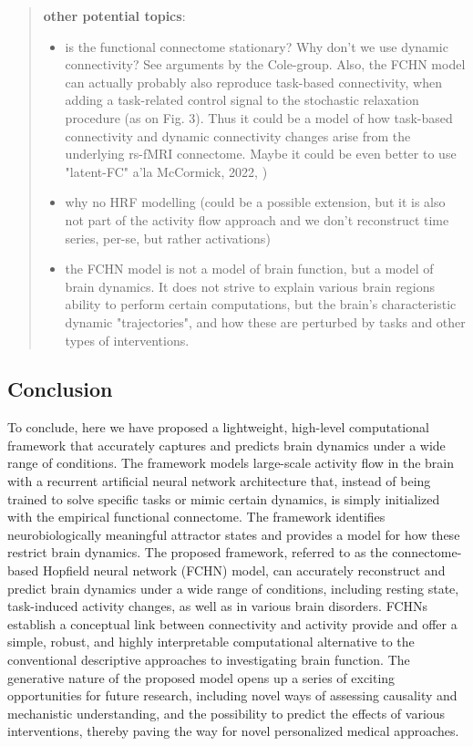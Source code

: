 \documentclass{article}
\begin{document}
\begin{quote}
\textbf{other potential topics}:

\begin{itemize}
\item is the functional connectome stationary? Why don't we use dynamic connectivity? See arguments by the Cole-group. Also, the FCHN model can actually probably also reproduce task-based connectivity, when adding a task-related control signal to the stochastic relaxation procedure (as on Fig. 3). Thus it could be a model of how task-based connectivity and dynamic connectivity changes arise from the underlying rs-fMRI connectome. Maybe it could be even better to use "latent-FC" a'la McCormick, 2022, \cite{McCormick_2022})
\item why no HRF modelling (could be a possible extension, but it is also not part of the activity flow approach and we don't reconstruct time series, per-se, but rather activations)
\item the FCHN model is not a model of brain function, but a model of brain dynamics. It does not strive to explain various brain regions ability to perform certain computations, but the brain's characteristic dynamic "trajectories", and how these are perturbed by tasks and other types of interventions.
\end{itemize}
\end{quote}

\subsection{Conclusion}\label{Conclusion}

To conclude, here we have proposed a lightweight, high-level computational framework that accurately captures and predicts brain dynamics under a wide range of conditions. The framework models large-scale activity flow in the brain with a recurrent artificial neural network architecture that, instead of being trained to solve specific tasks or mimic certain dynamics, is simply initialized with the empirical functional connectome. The framework identifies neurobiologically meaningful attractor states and provides a model for how these restrict brain dynamics. The proposed framework, referred to as the connectome-based Hopfield neural network (FCHN) model, can accurately reconstruct and predict brain dynamics under a wide range of conditions, including resting state, task-induced activity changes, as well as in various brain disorders. FCHNs establish a conceptual link between connectivity and activity provide and offer a simple, robust, and highly interpretable computational alternative to the conventional descriptive approaches to investigating brain function. The generative nature of the proposed model opens up a series of exciting opportunities for future research, including novel ways of assessing causality and mechanistic understanding, and the possibility to predict the effects of various interventions, thereby paving the way for novel personalized medical approaches.
\end{document}
